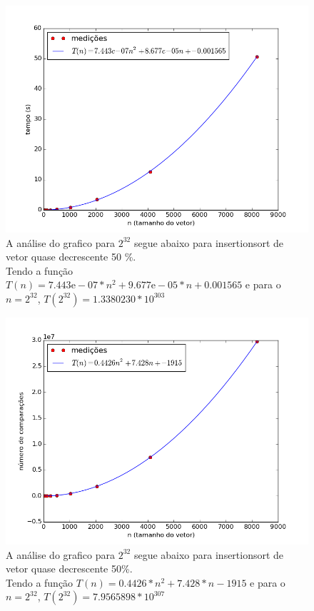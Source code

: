 \documentclass[12pt,a4paper,twoside]{report}
\begin{document}


\begin{figure}[ht]
\centering \includegraphics[scale=0.8]{../insertionsort/imagens/insertionsortQuaseDecresc500.png}
\caption{A análise do grafico para $2^{32}$ segue abaixo para insertionsort de vetor quase decrescente 50 \%.\\
Tendo a função $T (n) = 7.443\mathrm{e}-07*n^2+9.677\mathrm{e}-05*n+0.001565 $ e para o $n =2^{32}$, $T(2^{32}) = 1.3380230 * 10^{303}$}
\label{fig:insertionsortQuaseDecresc500}
\end{figure}

\begin{figure}[ht]
\centering \includegraphics[scale=0.8]{../insertionsort/imagens/insertionsortQuaseDecresc501.png}
\caption{A análise do grafico para $2^{32}$ segue abaixo para insertionsort de vetor quase decrescente 50\%.\\
Tendo a função $T(n) = 0.4426*n^2+7.428*n-1915$ e para o $n =2^{32}$, $T(2^{32}) = 7.9565898 * 10^{307}$}
\label{fig:insertionsortQuaseDecresc501}
\end{figure}
\end{document}
